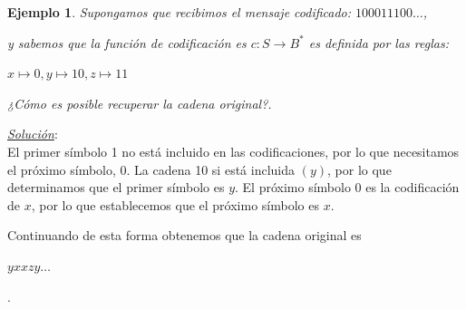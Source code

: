 \documentclass{beamer}
\newtheorem{ejemplo} [Ejemplo] {Ejemplo}
\begin{document}


\begin{frame}      \small
 
 
 \begin{ejemplo} 
Supongamos que recibimos el mensaje codificado: $100011100 \ldots$,

y sabemos que la función de codificación es $c: S\rightarrow B^{*}$ es definida por las reglas:
\begin{center} $x \mapsto 0,  y\mapsto 10, z \mapsto 11 $ \end{center}

¿Cómo es posible recuperar la cadena original?. 
\end{ejemplo}
\pause

\textit{\underline{Solución}}:\\

El primer símbolo 1 no está incluido en las codificaciones, por lo que necesitamos el próximo símbolo, 0. La cadena 10 si está incluida $(y)$, por lo que determinamos que el primer símbolo es $y$. El próximo símbolo 0 es la codificación de $x$, por lo que establecemos que el próximo símbolo es $x$. 

Continuando de esta forma obtenemos que la cadena original es\begin{center}
 $yxxzy \ldots$
\end{center} .

\end{frame}

\end{document}
